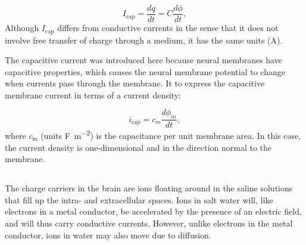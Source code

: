 \begin{equation}
I_\text{cap} = \frac{dq}{dt} = C\frac{d\phi}{dt}, 
\label{eq:Basics:Icap}
\end{equation}
Although $I_\text{cap}$ differs from conductive currents in the sense that it does not involve free transfer of charge through a medium, it has the same units (A). 

The capacitive current was introduced here because neural membranes have capacitive properties, which causes the neural membrane potential to change when currents pass through the membrane. It  to express the capacitive membrane current in terms of a current density: 

\begin{equation}
i_\text{cap} = c_m\frac{d\phi_m}{dt}, 
\label{eq:Basics:Icap_mem}
\end{equation}
where $c_\text{m}$ (units \si{\farad\per\square\metre}) is the capacitance per unit membrane area. In this case, the current density is one-dimensional and in the direction normal to the membrane.


\subsection{}
\label{sec:Basics:DiffusiveCurrent} 
 
The charge carriers in the brain are ions floating around in the saline solutions that fill up the intra- and extracellular spaces. Ions in salt water will, like electrons in a metal conductor, be accelerated by the presence of an electric field, and will thus carry conductive currents. However, unlike electrons in the metal conductor, ions in water may also move due to diffusion. 

